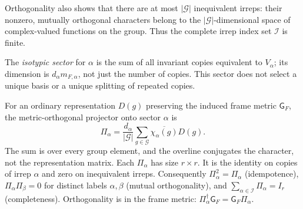 Orthogonality also shows that there are at most $|\mathcal G|$ inequivalent
irreps: their nonzero, mutually orthogonal characters belong to the
$|\mathcal G|$-dimensional space of complex-valued functions on the group.
Thus the complete irrep index set $\mathcal I$ is finite.

\begin{definition}
\label{def:symmetry-isotypic-sector}
The \emph{isotypic sector} for $\alpha$ is the sum of all invariant copies
equivalent to $V_\alpha$; its dimension is $d_\alpha m_{F,\alpha}$, not just
the number of copies. This sector does not select a unique basis or a unique
splitting of repeated copies.
\end{definition}

\begin{proposition}
\label{prop:symmetry-character-projector}
For an ordinary representation $D(g)$ preserving the induced frame metric
$\mathsf G_F$, the metric-orthogonal projector onto sector $\alpha$ is
\begin{equation}
  \Pi_\alpha=\frac{d_\alpha}{|\mathcal G|}
     \sum_{g\in\mathcal G}\overline{\chi_\alpha(g)}D(g).
  \label{eq:symmetry-isotypic-projector}
\end{equation}
The sum is over every group element, and the overline conjugates the
character, not the representation matrix. Each $\Pi_\alpha$ has size
$r\times r$. It is the identity on copies of irrep $\alpha$ and zero on
inequivalent irreps. Consequently
$\Pi_\alpha^2=\Pi_\alpha$ (idempotence),
$\Pi_\alpha\Pi_\beta=0$ for distinct labels $\alpha,\beta$ (mutual
orthogonality), and $\sum_{\alpha\in\mathcal I}\Pi_\alpha=I_r$
(completeness). Orthogonality is in the frame metric:
$\Pi_\alpha^{\dagger}\mathsf G_F=\mathsf G_F\Pi_\alpha$.
\end{proposition}

